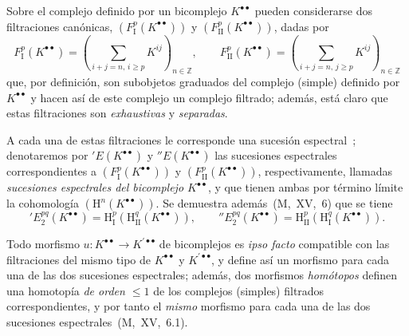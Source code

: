 \begin{env}[11.3.2]
\label{0.11.3.2}
\label{0.11.3.2-fr}
Sobre el complejo definido por un bicomplejo $K^{\bullet\bullet}$ pueden considerarse dos filtraciones canónicas, $(F_{\mathrm I}^p(K^{\bullet\bullet}))$ y $(F_{\mathrm{II}}^p(K^{\bullet\bullet}))$, dadas por
\[
\label{0.11.3.2.1-fr}
  F_{\mathrm I}^p(K^{\bullet\bullet})
  =\left(\sum_{i+j=n,\,i\geq p}K^{ij}\right)_{n\in\mathbb Z},
  \qquad
  F_{\mathrm{II}}^p(K^{\bullet\bullet})
  =\left(\sum_{i+j=n,\,j\geq p}K^{ij}\right)_{n\in\mathbb Z}
  \tag{11.3.2.1}
\]
que, por definición, son subobjetos graduados del complejo (simple) definido por $K^{\bullet\bullet}$ y hacen así de este complejo un complejo filtrado;
además, está claro que estas filtraciones son \emph{exhaustivas} y \emph{separadas}.

A cada una de estas filtraciones le corresponde una sucesión espectral~;
denotaremos por $'E(K^{\bullet\bullet})$ y $''E(K^{\bullet\bullet})$ las sucesiones espectrales correspondientes a $(F_{\mathrm I}^p(K^{\bullet\bullet}))$ y $(F_{\mathrm{II}}^p(K^{\bullet\bullet}))$, respectivamente, llamadas \emph{sucesiones espectrales del bicomplejo $K^{\bullet\bullet}$}, y que tienen ambas por término límite la cohomología $(\mathrm H^n(K^{\bullet\bullet}))$.
Se demuestra además~(M,~XV,~6) que se tiene
\[
\label{0.11.3.2.2-fr}
  'E_2^{pq}(K^{\bullet\bullet})
  =\mathrm H_{\mathrm I}^p(\mathrm H_{\mathrm{II}}^q(K^{\bullet\bullet})),
  \qquad
  ''E_2^{pq}(K^{\bullet\bullet})
  =\mathrm H_{\mathrm{II}}^p(\mathrm H_{\mathrm I}^q(K^{\bullet\bullet})).
  \tag{11.3.2.2}
\]

Todo morfismo $u:K^{\bullet\bullet}\to K^{\prime\bullet\bullet}$ de bicomplejos es \emph{ipso facto} compatible con las filtraciones del mismo tipo de $K^{\bullet\bullet}$ y $K^{\prime\bullet\bullet}$, y define así un morfismo para cada una de las dos sucesiones espectrales;
además, dos morfismos \emph{homótopos} definen una homotopía \emph{de orden $\leq1$} de los complejos (simples) filtrados correspondientes, y por tanto el \emph{mismo} morfismo para cada una de las dos sucesiones espectrales~(M,~XV,~6.1).
\end{env}

